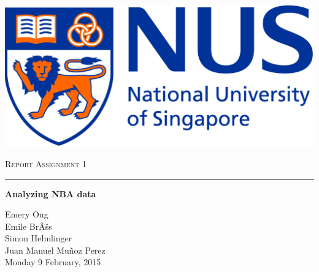 
\begin{center}
	\begin{flushleft}
		\includegraphics[scale=0.1]{images/NUS.jpg}
		
	\end{flushleft}
	
	
	\vskip 5cm
	{\LARGE\textsc{Report Assignment 1}}\\
	\noindent\rule{4cm}{0.2pt}
	\vskip 0.5cm
	{\LARGE\textbf{Analyzing NBA data}}
	\vskip 4.5cm
	
	\LARGE{Emery Ong}\\
	\LARGE{Emile BrÃšs}\\
	\LARGE{Simon Helmlinger}\\
	\LARGE{Juan Manuel Mu\~noz Perez}\\
	
	\vspace{1.0cm}
	\Large{Monday 9 February, 2015}
	
	\vspace{2.cm}
	
\end{center}
